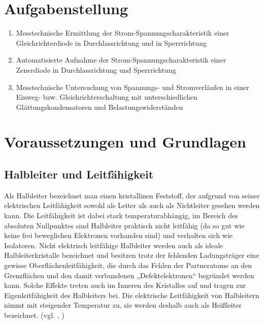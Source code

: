\documentclass{article}
\begin{document}
\parindent0cm




\pagestyle{fancy}

\tableofcontents
\newpage
\section{Aufgabenstellung}



\begin{enumerate}
\item Messtechnische Ermittlung der Strom-Spannungscharakteristik einer Gleichrichterdiode in Durchlassrichtung und in Sperrrichtung
\item Automatisierte Aufnahme der Strom-Spannungscharakteristik einer Zenerdiode in Durchlassrichtung und Sperrrichtung
\item Messtechnische Untersuchung von Spannungs- und Stromverläufen in einer Einweg- bzw. Gleichrichterschaltung mit unterschiedlichen Glättungskondensatoren und Belastungswiderständen
\end{enumerate}



\section{Voraussetzungen und Grundlagen}

\subsection{Halbleiter und Leitfähigkeit}

Als Halbleiter bezeichnet man einen kristallinen Feststoff, der aufgrund von seiner elektrischen Leitfähigkeit sowohl als Leiter als auch als Nichtleiter gesehen werden kann. Die Leitfähigkeit ist dabei stark temperaturabhängig, im Bereich des absoluten Nullpunktes sind Halbleiter praktisch nicht leitfähig (da so gut wie keine frei beweglichen Elektronen vorhanden sind) und verhalten sich wie Isolatoren. Nicht elektrisch leitfähige Halbleiter werden auch als ideale Halbleiterkristalle bezeichnet und besitzen trotz der fehlenden Ladungsträger eine gewisse Oberflächenleitfähigkeit, die durch das Fehlen der Partneratome an den Grenzflächen und den damit verbundenen „Defektelektronen“ begründet werden kann. Solche Effekte treten auch im Inneren des Kristalles auf und tragen zur Eigenleitfähigkeit des Halbleiters bei.
Die elektrische Leitfähigkeit von Halbleitern nimmt mit steigender Temperatur zu, sie werden deshalb auch als Heißleiter bezeichnet. (vgl. \cite{moodle}, \cite{halbleiter})
\end{document}
